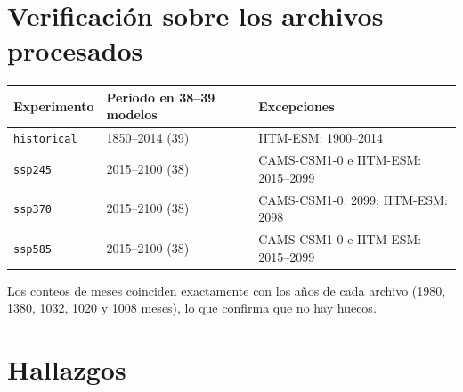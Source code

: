 \section{Verificación sobre los archivos procesados}

\begin{center}\small
\begin{tabular}{@{}lll@{}}
\toprule
Experimento & Periodo en 38--39 modelos & Excepciones \\
\midrule
\texttt{historical} & 1850--2014 (39) & IITM-ESM: 1900--2014 \\
\texttt{ssp245} & 2015--2100 (38) & CAMS-CSM1-0 e IITM-ESM: 2015--2099 \\
\texttt{ssp370} & 2015--2100 (38) & CAMS-CSM1-0: 2099; IITM-ESM: 2098 \\
\texttt{ssp585} & 2015--2100 (38) & CAMS-CSM1-0 e IITM-ESM: 2015--2099 \\
\bottomrule
\end{tabular}
\end{center}

Los conteos de meses coinciden exactamente con los años de cada archivo (1980, 1380, 1032, 1020 y 1008 meses), lo que confirma que no hay huecos.

\section{Hallazgos}

